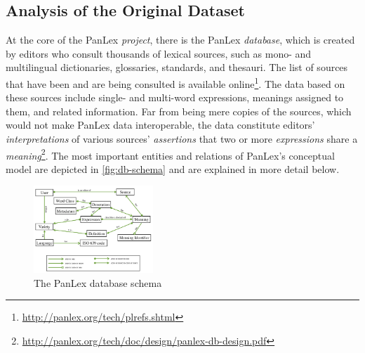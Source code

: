 \documentclass[sw]{iosart2c}
\begin{document}

\subsection{Analysis of the Original Dataset}
\label{sec:analysis}
At the core of the PanLex \emph{project}, there is the PanLex \emph{database}, which is created by editors who consult thousands of lexical sources, such as mono- and multilingual dictionaries, glossaries, standards, and thesauri.
The list of sources that have been and are being consulted is available online\footnote{\url{http://panlex.org/tech/plrefs.shtml}}.
The data based on these sources include single- and multi-word expressions, meanings assigned to them, and related information. Far from being mere copies of the sources, which would not make PanLex data interoperable, the data constitute editors' \emph{interpretations} of various sources' \emph{assertions} that two or more \emph{expressions} share a \emph{meaning}\footnote{\url{http://panlex.org/tech/doc/design/panlex-db-design.pdf}}.
The most important entities and relations of PanLex's conceptual model are depicted in \autoref{fig:db-schema} and are explained in more detail below.

\begin{figure}
  \centering
  \includegraphics[width=0.4\textwidth]{images/schema_new.png}
  \caption{The PanLex database schema}
  \label{fig:db-schema}
\end{figure}
\end{document}

